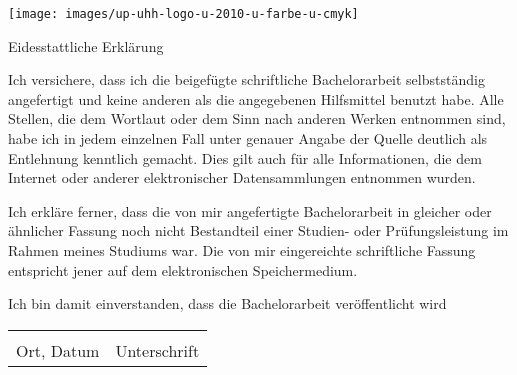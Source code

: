 \documentclass{scrreport}
\begin{document}
\texttt{[image: images/up-uhh-logo-u-2010-u-farbe-u-cmyk]}\par
\vspace{4\baselineskip}

{\centering \huge Eidesstattliche Erklärung\par}

\vspace{1cm}

Ich versichere, dass ich die beigefügte schriftliche Bachelorarbeit selbstständig angefertigt und keine anderen als die angegebenen Hilfsmittel benutzt habe.
Alle Stellen, die dem Wortlaut oder dem Sinn nach anderen Werken entnommen sind, habe ich in jedem einzelnen Fall unter genauer Angabe der Quelle deutlich als Entlehnung kenntlich gemacht.
Dies gilt auch für alle Informationen, die dem Internet oder anderer elektronischer Datensammlungen entnommen wurden.

Ich erkläre ferner, dass die von mir angefertigte Bachelorarbeit in gleicher oder ähnlicher Fassung noch nicht Bestandteil einer Studien- oder Prüfungsleistung im Rahmen meines Studiums war.
Die von mir eingereichte schriftliche Fassung entspricht jener auf dem elektronischen Speichermedium.

Ich bin damit einverstanden, dass die Bachelorarbeit veröffentlicht wird

\vspace{2cm}

\begin{tabular}{@{}p{5cm}p{8cm}@{}}
    \hrulefill & \hrulefill \\
    Ort, Datum & Unterschrift \\
\end{tabular}
    
\end{document}
